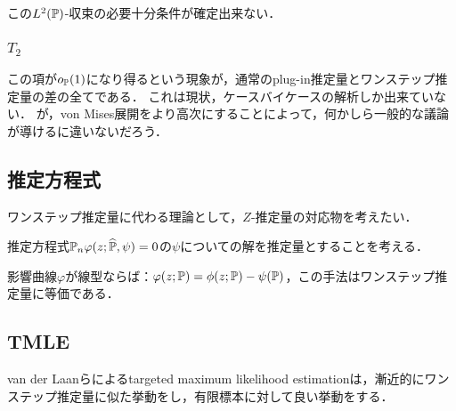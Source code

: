 \documentclass[uplatex,dvipdfmx]{jsreport}
\begin{document}
\begin{discussion}
    この$L^2(\mathbb{P})$-収束の必要十分条件が確定出来ない．
\end{discussion}

\subsubsection{$T_2$}

\begin{tcolorbox}[colframe=ForestGreen, colback=ForestGreen!10!white,breakable,colbacktitle=ForestGreen!40!white,coltitle=black,fonttitle=\bfseries\sffamily,
title=]
    この項が$o_{\mathbb{P}}(1)$になり得るという現象が，通常のplug-in推定量とワンステップ推定量の差の全てである．
    これは現状，ケースバイケースの解析しか出来ていない．
    が，von Mises展開をより高次にすることによって，何かしら一般的な議論が導けるに違いないだろう．
\end{tcolorbox}

\subsection{推定方程式}

\begin{tcolorbox}[colframe=ForestGreen, colback=ForestGreen!10!white,breakable,colbacktitle=ForestGreen!40!white,coltitle=black,fonttitle=\bfseries\sffamily,
title=]
    ワンステップ推定量に代わる理論として，$Z$-推定量の対応物を考えたい．
\end{tcolorbox}

\begin{discussion}
    推定方程式$\mathbb{P}_n\varphi(z;\widehat{\mathbb{P}},\psi)=0$の$\psi$についての解を推定量とすることを考える．

    影響曲線$\varphi$が線型ならば：$\varphi(z;\mathbb{P})=\phi(z;\mathbb{P})-\psi(\mathbb{P})$，この手法はワンステップ推定量に等価である．
\end{discussion}

\subsection{TMLE}

\begin{tcolorbox}[colframe=ForestGreen, colback=ForestGreen!10!white,breakable,colbacktitle=ForestGreen!40!white,coltitle=black,fonttitle=\bfseries\sffamily,
title=]
    van der Laanらによるtargeted maximum likelihood estimationは，漸近的にワンステップ推定量に似た挙動をし，有限標本に対して良い挙動をする．
\end{tcolorbox}
\end{document}
